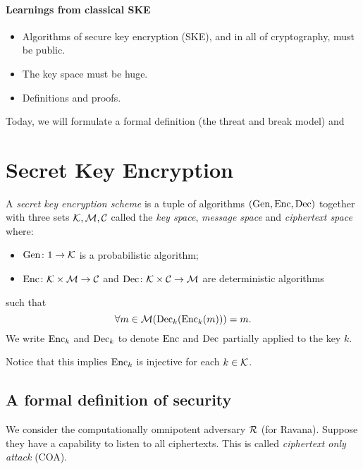 \subsubsection{Learnings from classical SKE} \label{sec:classical:learning}
\begin{itemize}
    \item Algorithms of secure key encryption (SKE), and in all of
        cryptography, must be public.
    \item The key space must be huge.
    \item Definitions and proofs.
\end{itemize}

Today, we will formulate a formal definition (the threat and break model)
and 

\chapter{Secret Key Encryption} \label{chp:ske}
\begin{definition*} \label{def:ske}
    A \emph{secret key encryption scheme} is a tuple of algorithms
    $(\operatorname{Gen}, \operatorname{Enc}, \operatorname{Dec})$ together with three sets $\mathcal{K}, \mathcal{M}, \mathcal{C}$
    called the \emph{key space}, \emph{message space} and
    \emph{ciphertext space} where:
    \begin{itemize}
        \item $\operatorname{Gen}\colon 1 \to \mathcal{K}$ is a probabilistic algorithm;
        \item $\operatorname{Enc}\colon \mathcal{K} \times \mathcal{M} \to \mathcal{C}$ and
            $\operatorname{Dec}\colon \mathcal{K} \times \mathcal{C} \to \mathcal{M}$
            are deterministic algorithms
    \end{itemize}
    such that \[
        \forall m \in \mathcal{M}(\operatorname{Dec}_k (\operatorname{Enc}_k(m))) = m.
    \]
    We write $\operatorname{Enc}_k$ and $\operatorname{Dec}_k$ to denote $\operatorname{Enc}$ and $\operatorname{Dec}$
    partially applied to the key $k$.
\end{definition*}
\begin{remark}
    Notice that this implies $\operatorname{Enc}_k$ is injective for each $k \in \mathcal{K}$.
\end{remark}

\section{A formal definition of security} \label{sec:defining-security}

We consider the computationally omnipotent adversary $\mathcal{R}$ (for Ravana).
Suppose they have a capability to listen to all ciphertexts.
This is called \emph{ciphertext only attack} (COA).

